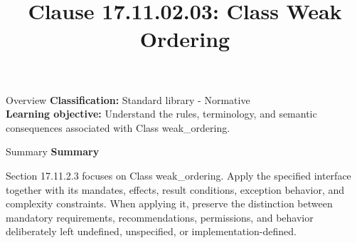 \documentclass[10pt,letterpaper]{article}
\title{Clause 17.11.02.03: Class Weak Ordering}
\author{}
\date{}
\begin{document}
\maketitle
\begin{CornellOverviewBox}{Overview}
\textbf{Classification:} Standard library - Normative\\[2pt]
\textbf{Learning objective:} Understand the rules, terminology, and semantic consequences associated with Class weak\_ordering.
\end{CornellOverviewBox}\begin{CornellSummaryBox}{Summary}
{\sffamily\bfseries\color{Accent} Summary}\par\vspace{3pt}Section 17.11.2.3 focuses on Class weak\_ordering. Apply the specified interface together with its mandates, effects, result conditions, exception behavior, and complexity constraints. When applying it, preserve the distinction between mandatory requirements, recommendations, permissions, and behavior deliberately left undefined, unspecified, or implementation-defined.
\end{CornellSummaryBox}
\end{document}

